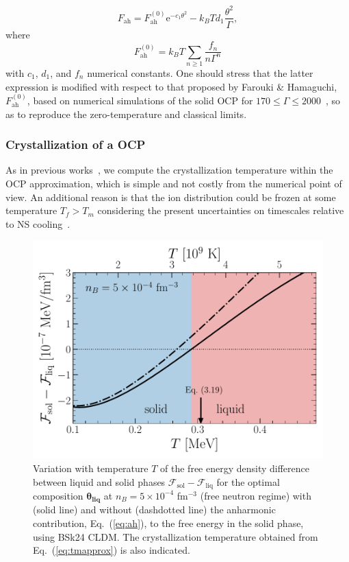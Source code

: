 \begin{equation}
  F_{\text{ah}} =
  F_{\text{ah}}^{(0)}\text{e}^{-c_1\theta^2} 
  - k_B T d_1\frac{\theta^2}{\Gamma},\label{eq:ah}
\end{equation}
%
where
%
\begin{equation}
  F_{\text{ah}}^{(0)} = k_B T\sum_{n \geq 1}\frac{f_n}{n\Gamma^n}
\end{equation}
%
with $c_1$, $d_1$, and $f_n$ numerical constants. One should stress that
the latter expression is modified with respect to that proposed by Farouki \&
Hamaguchi, $F_{\text{ah}}^{(0)}$, based on numerical simulations of 
the solid OCP for $170 \leq \Gamma \leq 2000$~\cite{Farouki1993}, so as to
reproduce the zero-temperature and classical limits.

\subsubsection{Crystallization of a OCP}

As in previous works~\cite{Fantina2020,Carreau2019,Carreau2020}, we compute 
the crystallization temperature within the OCP approximation, which is 
simple and not costly from the numerical point of view. An additional reason is
that the ion distribution  could be frozen at some temperature $T_f > T_m$ 
considering the present uncertainties on timescales relative to NS 
cooling~\cite{Goriely2011}.

\begin{figure}[!t]
  \begin{center}
    \includegraphics[width=0.9\linewidth]{figures/fliqsol.pdf}
  \end{center}
  \caption[Free energy density difference between liquid and solid phases
  versus temperature]{Variation with temperature $T$ of the free energy density
  difference between liquid and solid phases
$\mathcal{F}_{\text{sol}}-\mathcal{F}_{\text{liq}}$ for the optimal composition
$\bm{\theta_{\text{liq}}}$ at $n_B=5\times 10^{-4}$ fm$^{-3}$ (free neutron 
regime) with (solid line) and without (dashdotted line) the anharmonic
contribution, Eq.~(\ref{eq:ah}), to the free energy in the solid 
phase, using BSk24 CLDM. The crystallization temperature obtained from 
Eq.~(\ref{eq:tmapprox}) is also indicated.}\label{fig:fliqsol}
\end{figure}

